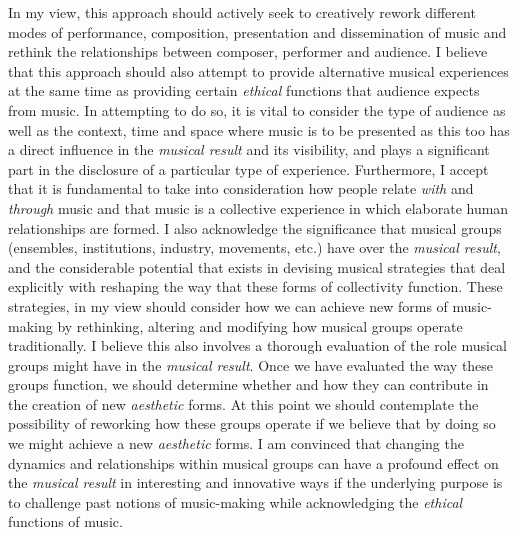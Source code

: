 In my view, this approach should actively seek to creatively rework different modes of performance, composition, presentation and dissemination of music and rethink the relationships between composer, performer and audience. I believe that this approach should also attempt to provide alternative musical experiences at the same time as providing certain \emph{ethical} functions that audience expects from music. In attempting to do so, it is vital to consider the type of audience as well as the context, time and space where music is to be presented as this too has a direct influence in the \emph{musical result} and its visibility, and plays a significant part in the disclosure of a particular type of experience. Furthermore, I accept that it is fundamental to take into consideration how people relate \emph{with} and \emph{through} music and that music is a collective experience in which elaborate human relationships are formed. I also acknowledge the significance that musical groups (ensembles, institutions, industry, movements, etc.) have over the \emph{musical result}, and the considerable potential that exists in devising musical strategies that deal explicitly with reshaping the way that these forms of collectivity function. These strategies, in my view should consider how we can achieve new forms of music-making by rethinking, altering and modifying how musical groups operate traditionally. I believe this also involves a thorough evaluation of the role musical groups might have in the \emph{musical result}. Once we have evaluated the way these groups function, we should determine whether and how they can contribute in the creation of new \emph{aesthetic} forms. At this point we should contemplate the possibility of reworking how these groups operate if we believe that by doing so we might achieve a new \emph{aesthetic} forms. I am convinced that changing the dynamics and relationships within musical groups can have a profound effect on the \emph{musical result} in interesting and innovative ways if the underlying purpose is to challenge past notions of music-making while acknowledging the \emph{ethical} functions of music. 

\indent

